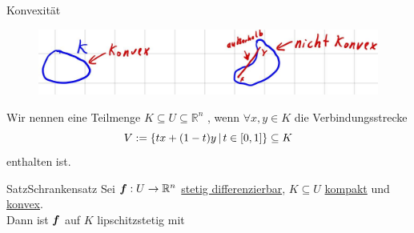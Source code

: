 \begin{Def}
{Konvexität}
\begin{figure}
 \vspace{-15pt}
\includegraphics[width=.35\textwidth]{Dateien/09/09Konvex.jpg}
 \vspace{-15pt}
\end{figure}
Wir nennen eine Teilmenge $K\subseteq U\subseteq\mathbb{R}^n$ , wenn $\forall x,y\in K$ die Verbindungsstrecke
\begin{equation*}
    V:=\left\{tx+(1-t)y\,|\, t\in[0,1]\right\}\subseteq K
\end{equation*}
enthalten ist. 
\end{Def}
\begin{Satz}
{Satz}{Schrankensatz}
Sei ${{\text{\boldmath${f}$}}}:U\to\mathbb{R}^n$ \underline{stetig differenzierbar}, $K\subseteq U$ \underline{kompakt} und \underline{konvex}.\\
Dann ist ${{\text{\boldmath${f}$}}}$ auf $K$ lipschitzstetig mit 
\end{Satz}
